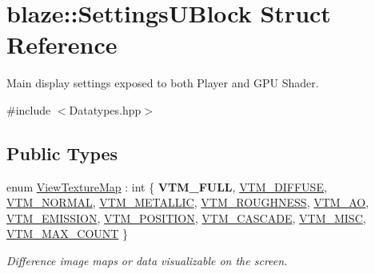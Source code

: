 \hypertarget{structblaze_1_1SettingsUBlock}{}\section{blaze\+:\+:Settings\+U\+Block Struct Reference}
\label{structblaze_1_1SettingsUBlock}


Main display settings exposed to both Player and G\+PU Shader.  




{\ttfamily \#include $<$Datatypes.\+hpp$>$}

\subsection*{Public Types}
\begin{DoxyCompactItemize}
\item 
enum \hyperlink{structblaze_1_1SettingsUBlock_aa79fb061eee4130840f5ba7a8b36fdff}{View\+Texture\+Map} \+: int \{ \newline
{\bfseries V\+T\+M\+\_\+\+F\+U\+LL}, 
\hyperlink{structblaze_1_1SettingsUBlock_aa79fb061eee4130840f5ba7a8b36fdffa4090b24cd88f439ddf511b3ffc688698}{V\+T\+M\+\_\+\+D\+I\+F\+F\+U\+SE}, 
\hyperlink{structblaze_1_1SettingsUBlock_aa79fb061eee4130840f5ba7a8b36fdffa479628b3633fef2edb7665c884109c3f}{V\+T\+M\+\_\+\+N\+O\+R\+M\+AL}, 
\hyperlink{structblaze_1_1SettingsUBlock_aa79fb061eee4130840f5ba7a8b36fdffa7336c0dafc26bf28da993c839fac0253}{V\+T\+M\+\_\+\+M\+E\+T\+A\+L\+L\+IC}, 
\newline
\hyperlink{structblaze_1_1SettingsUBlock_aa79fb061eee4130840f5ba7a8b36fdffa373c6efa35d86a4552c64232508eb401}{V\+T\+M\+\_\+\+R\+O\+U\+G\+H\+N\+E\+SS}, 
\hyperlink{structblaze_1_1SettingsUBlock_aa79fb061eee4130840f5ba7a8b36fdffa6da51d120987704e0050ae2c4b09a670}{V\+T\+M\+\_\+\+AO}, 
\hyperlink{structblaze_1_1SettingsUBlock_aa79fb061eee4130840f5ba7a8b36fdffa4bfc17f599882a435c2e1eeef3cadc31}{V\+T\+M\+\_\+\+E\+M\+I\+S\+S\+I\+ON}, 
\hyperlink{structblaze_1_1SettingsUBlock_aa79fb061eee4130840f5ba7a8b36fdffaec02f1162167da8431b10d566a8fbf15}{V\+T\+M\+\_\+\+P\+O\+S\+I\+T\+I\+ON}, 
\newline
\hyperlink{structblaze_1_1SettingsUBlock_aa79fb061eee4130840f5ba7a8b36fdffafbc5b5961b516f23c4f4271fb2995d63}{V\+T\+M\+\_\+\+C\+A\+S\+C\+A\+DE}, 
\hyperlink{structblaze_1_1SettingsUBlock_aa79fb061eee4130840f5ba7a8b36fdffa4f3bec70ad9852c14460c0d8e94c1bac}{V\+T\+M\+\_\+\+M\+I\+SC}, 
\hyperlink{structblaze_1_1SettingsUBlock_aa79fb061eee4130840f5ba7a8b36fdffaab456181ac55efa82604a7523ae63495}{V\+T\+M\+\_\+\+M\+A\+X\+\_\+\+C\+O\+U\+NT}
 \}\begin{DoxyCompactList}\small\item\em Difference image maps or data visualizable on the screen. \end{DoxyCompactList}
\end{DoxyCompactItemize}
